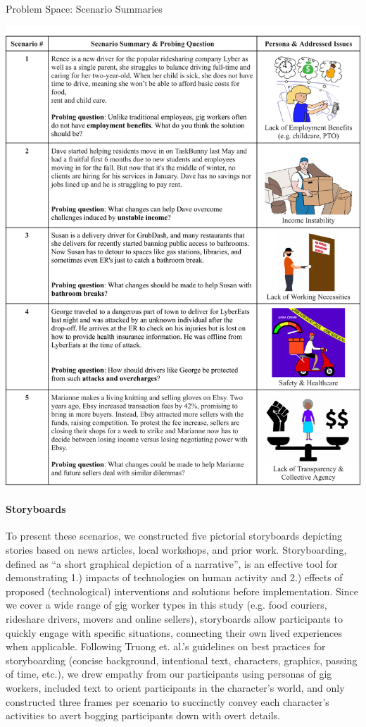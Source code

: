 \FloatBarrier
\begin{table}[h!]
  \centering
   \caption{Problem Space: Scenario Summaries}
    \includegraphics[width=\textwidth]{Chapters/ch4/scenarios.pdf}
  \label{tab:scenarios}
\end{table}
\FloatBarrier

\paragraph{Storyboards} To present these scenarios, we constructed five pictorial storyboards depicting stories based on news articles, local workshops, and prior work. Storyboarding, defined as ``a short graphical depiction of a narrative'', is an effective tool for demonstrating 1.) impacts of technologies on human activity and 2.) effects of proposed (technological) interventions and solutions before implementation. Since we cover a wide range of gig worker types in this study (e.g. food couriers, rideshare drivers, movers and online sellers), storyboards allow participants to quickly engage with specific situations, connecting their own lived experiences when applicable. 
Following  Truong et. al.'s guidelines \cite{truong2006storyboarding} on best practices for storyboarding (concise background, intentional text, characters, graphics, passing of time, etc.), we drew empathy from our participants using personas of gig workers, included text to orient participants in the character's world, and only constructed three frames per scenario to succinctly convey each character's activities to avert bogging participants down with overt details.

